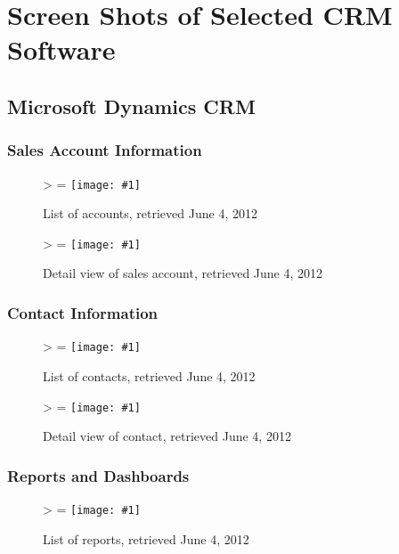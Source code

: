 \documentclass[12pt,letterpaper]{article}
\newlength{\imgwidth}
\newlength{\imgheight}
\newlength{\finalwidth}
\newlength{\finalheight}
\newlength{\imgtextheight}
\newcommand\scalegraphics[1]{%
	\settowidth{\imgwidth}{\texttt{[image: \#1]}}%
	\settoheight{\imgheight}{\texttt{[image: \#1]}}%
	\ifnum\imgwidth>\imgheight \def\imgangle{90} \else \def\imgangle{0} \fi%
	\setlength{\imgtextheight}{0.74\textheight}%
	\setlength{\finalwidth}{\minof{\imgwidth}{\textwidth}}%
	\setlength{\finalheight}{\minof{\imgheight}{\imgtextheight}}%
	\ifnum\finalwidth=\imgwidth \def\imgangle{0} \fi%
	\texttt{[image: \#1]}%
}
\begin{document}
\section{Screen Shots of Selected CRM Software}
\label{app:screenshots}

\subsection{Microsoft Dynamics CRM}
\label{appsec:microsoft}
\subsubsection{Sales Account Information}

\begin{figure}[htbp]
	\centering
	\scalegraphics{./img/dynamics/msft_account_list}
	\caption[Microsoft Dynamics CRM: List of accounts]{List of accounts, retrieved June 4, 2012}
\end{figure}

\begin{figure}[htbp]
	\centering
	\scalegraphics{./img/dynamics/msft_account_detail}
	\caption[Microsoft Dynamics CRM: Detail view of sales account]{Detail view of sales account, retrieved June 4, 2012}
\end{figure}

\newpage
\FloatBarrier
\subsubsection{Contact Information}
\begin{figure}[htbp]
	\centering
	\scalegraphics{./img/dynamics/msft_contact_list}
	\caption[Microsoft Dynamics CRM: List of contacts]{List of contacts, retrieved June 4, 2012}
\end{figure}

\begin{figure}[htbp]
	\centering
	\scalegraphics{./img/dynamics/msft_contact_detail}
	\caption[Microsoft Dynamics CRM: Detail view of contact]{Detail view of contact, retrieved June 4, 2012}
\end{figure}

\newpage
\FloatBarrier
\subsubsection{Reports and Dashboards}

\begin{figure}[htbp]
	\centering
	\scalegraphics{./img/dynamics/msft_reports}
	\caption[Microsoft Dynamics CRM: List of reports]{List of reports, retrieved June 4, 2012}
\end{figure}
\end{document}
